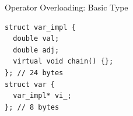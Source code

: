 \documentclass[dvipsnames]{beamer}
\begin{document}

\begin{frame}[fragile]{Operator Overloading: Basic Type}
\begin{verbatim}
struct var_impl {
  double val;
  double adj;
  virtual void chain() {};
}; // 24 bytes
struct var {
  var_impl* vi_;
}; // 8 bytes
\end{verbatim}
\end{frame}
\end{document}
